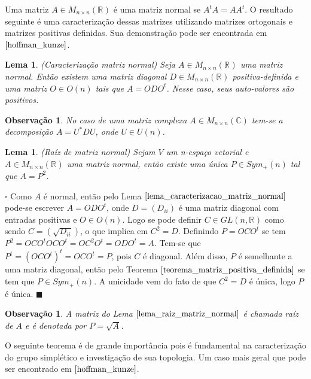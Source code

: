 \documentclass[12pt]{book}
\newtheorem{lema}[teorema]{Lema}
\newtheorem{observacao}[teorema]{Observação}
\newenvironment{prova}[1]{$\square$ #1}{\hfill$\blacksquare$}
\newcommand{\generalgroup}[2]{GL(#1, #2)}
\newcommand{\generalgroupreal}[1]{\generalgroup{#1}{\real{}}}
\newcommand{\matrizortogonal}[1]{O(#1)}
\newcommand{\matrizquadreal}[1]{M_{#1 \times #1}(\real{})}
\newcommand{\matrizsimetricapositiva}[1]{Sym_{+}(#1)}
\newcommand{\matrizunitaria}[1]{U(#1)}
\newcommand{\real}[1]{\mathbb{R}^{#1}}
\begin{document}
	Uma matriz $A\in \matrizquadreal{n}$ é uma matriz normal se $A^{t}A=AA^{t}$. O resultado seguinte é uma caracterização dessas matrizes utilizando matrizes ortogonais e matrizes positivas definidas. Sua demonstração pode ser encontrada em $\cite{hoffman_kunze}$.
	
	\begin{lema}\label{lema_caracterizacao_matriz_normal}
		(Caracterização matriz normal) Seja $A\in \matrizquadreal{n}$ uma matriz normal. Então existem uma matriz diagonal $D \in \matrizquadreal{n}$ positiva-definida e uma matriz $O\in \matrizortogonal{n}$ tais que $A=ODO^{t}$. Nesse caso, seus auto-valores são positivos. 
	\end{lema}
	
	\begin{observacao}\label{observacao_caracterizacao_matriz_normal}
		No caso de uma matriz complexa $A \in M_{n\times n}(\mathbb{C})$ tem-se a decomposição $A=U^{*}DU$, onde $U \in \matrizunitaria{n}$.
	\end{observacao}
	
	\begin{lema}\label{lema_raiz_matriz_normal}
		(Raíz de matriz normal) Sejam $V$ um n-espaço vetorial e $A\in \matrizquadreal{n}$ uma matriz normal, então existe uma única $P\in \matrizsimetricapositiva{n}$ tal que $A=P^{2}$. 
	\end{lema}
	\begin{prova}
		Como $A$ é normal, então pelo Lema $\ref{lema_caracterizacao_matriz_normal}$ pode-se escrever $A=ODO^{t}$, onde $D=(D_{ii})$ é uma matriz diagonal com entradas positivas e $O\in \matrizortogonal{n}$. Logo se pode definir $C \in \generalgroupreal{n}$ como sendo $C = (\sqrt{D_{ii}})$, o que implica em $C^{2} = D$. Definindo $P = OCO^{t}$ se tem $P^{2} = OCO^{t}OCO^{t} = OC^{2}O^{t} = ODO^{t}=A$. Tem-se que $P^{t} = (OCO^{t})^{t} = OCO^{t} = P$, pois $C$ é diagonal. Além disso, $P$ é semelhante a uma matriz diagonal, então pelo Teorema $\ref{teorema_matriz_positiva_definida}$ se tem que $P \in \matrizsimetricapositiva{n}$. A unicidade vem do fato de que $C^{2} = D$ é única, logo $P$ é única.
	\end{prova}
	
	\begin{observacao}\label{observacao_raiz_matriz_normal}
		A matriz do Lema $\ref{lema_raiz_matriz_normal}$ é chamada raíz de $A$ e é denotada por $P=\sqrt{A}$.
	\end{observacao}
	
	O seguinte teorema é de grande importância pois é fundamental na caracterização do grupo simplético e investigação de sua topologia. Um caso mais geral que pode ser encontrado em $\cite{hoffman_kunze}$.
	
\end{document}
